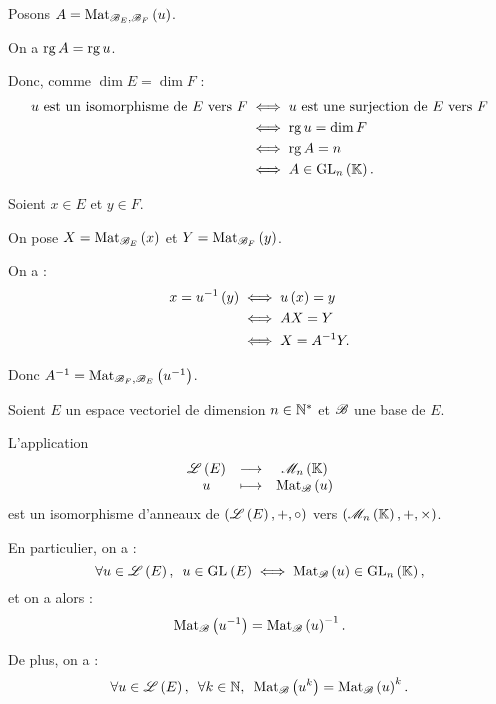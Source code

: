 \begin{dem}
Posons \(A=\Mat[\fami{B}_E,\fami{B}_F]{u}\).

On a \(\operatorname{rg} A=\operatorname{rg} u\).

Donc, comme \(\dim E=\dim F\) : \[\begin{aligned}
u\text{ est un isomorphisme de }E\text{ vers }F&\ssi u\text{ est une surjection de }E\text{ vers }F \\
&\ssi\rg u=\dim F \\
&\ssi\rg A=n \\
&\ssi A\in\GL{n}.
\end{aligned}\]

Soient \(x\in E\) et \(y\in F\).

On pose \(X=\Mat[\fami{B}_E]{x}\) et \(Y=\Mat[\fami{B}_F]{y}\).

On a : \[\begin{aligned}
x=u^{-1}\left(y\right)&\iff u\left(x\right)=y \\
&\iff AX=Y \\
&\iff X=A^{-1} Y.
\end{aligned}\]

Donc \(A\inv=\Mat[\fami{B}_F,\fami{B}_E]{u\inv}\).
\end{dem}

\begin{prop}
Soient \(E\) un espace vectoriel de dimension \(n\in\mathbb{N}^*\) et \(\mathscr{B}\) une base de \(E\).

L'application \[\fonctionlambda{\Lendo{E}}{\M{n}}{u}{\Mat{u}}\] est un isomorphisme d'anneaux de \(\anneau{\Lendo{E}}[+][\rond]\) vers \(\anneau{\M{n}}\).

En particulier, on a : \[\quantifs{\forall u\in\Lendo{E}}u\in\GL{}[E]\ssi\Mat{u}\in\GL{n},\] et on a alors : \[\Mat{u\inv}=\Mat{u}\inv.\]

De plus, on a : \[\quantifs{\forall u\in\Lendo{E};\forall k\in\N}\Mat{u^k}=\Mat{u}^k.\]
\end{prop}